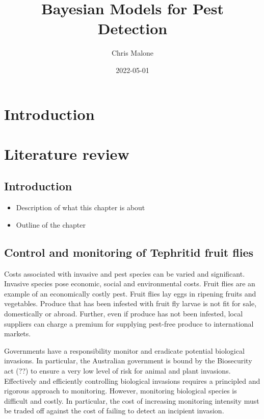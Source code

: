 \documentclass[
]{book}
\title{Bayesian Models for Pest Detection}
\author{Chris Malone}
\date{2022-05-01}
\providecommand{\tightlist}{%
  \setlength{\itemsep}{0pt}\setlength{\parskip}{0pt}}
\begin{document}
\maketitle

\renewcommand{\baselinestretch}{1}\normalsize
\tableofcontents
\renewcommand{\baselinestretch}{2}\normalsize

\hypertarget{introduction}{%
\chapter{Introduction}\label{introduction}}

\hypertarget{lit-review}{%
\chapter{Literature review}\label{lit-review}}

\hypertarget{introduction-1}{%
\section{Introduction}\label{introduction-1}}

\begin{itemize}
\tightlist
\item
  Description of what this chapter is about
\item
  Outline of the chapter
\end{itemize}

\hypertarget{control-and-monitoring-of-tephritid-fruit-flies}{%
\section{Control and monitoring of Tephritid fruit flies}\label{control-and-monitoring-of-tephritid-fruit-flies}}

Costs associated with invasive and pest species can be varied and significant. Invasive species pose economic, social and environmental costs. Fruit flies are an example of an economically costly pest. Fruit flies lay eggs in ripening fruits and vegetables. Produce that has been infested with fruit fly larvae is not fit for sale, domestically or abroad. Further, even if produce has not been infested, local suppliers can charge a premium for supplying pest-free produce to international markets.

Governments have a responsibility monitor and eradicate potential biological invasions. In particular, the Australian government is bound by the Biosecurity act (??) to ensure a very low level of risk for animal and plant invasions. Effectively and efficiently controlling biological invasions requires a principled and rigorous approach to monitoring. However, monitoring biological species is difficult and costly. In particular, the cost of increasing monitoring intensity must be traded off against the cost of failing to detect an incipient invasion.
\end{document}
